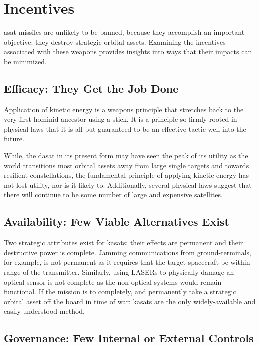 \section*{Incentives}

\ac{asat} missiles are unlikely to be banned, because they accomplish
an important objective: they destroy strategic orbital assets.
Examining the incentives associated with these weapons provides
insights into ways that their impacts can be minimized.

\subsection*{Efficacy: They Get the Job Done}

Application of kinetic energy is a weapons principle that stretches
back to the very first hominid ancestor using a stick.  It is a
principle so firmly rooted in physical laws that it is all but
guaranteed to be an effective tactic well into the future.

While, the \ac{dasat} in its present form may have seen the peak of
its utility as the world transitions most orbital assets away from
large single targets and towards resilient constellations, the
fundamental principle of applying kinetic energy has not lost utility,
nor is it likely to.  Additionally, several physical laws suggest that
there will continue to be some number of large and expensive
satellites.


\subsection*{Availability: Few Viable Alternatives Exist}

Two strategic attributes exist for \acp{kasat}: their effects are
permanent and their destructive power is complete.  Jamming
communications from ground-terminals, for example, is not permanent as
it requires that the target spacecraft be within range of the
transmitter.  Similarly, using LASERs to physically damage an optical
sensor is not complete as the non-optical systems would remain
functional.  If the mission is to completely, and permanently take a
strategic orbital asset off the board in time of war: \acp{kasat} are
the only widely-available and easily-understood method.


\subsection*{Governance: Few Internal or External Controls}

